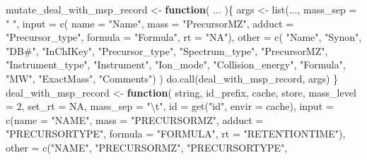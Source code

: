 \documentclass[
]{article}
\newenvironment{Shaded}{\begin{snugshade}}{\end{snugshade}}
\newcommand{\AttributeTok}[1]{\textcolor[rgb]{0.77,0.63,0.00}{#1}}
\newcommand{\ConstantTok}[1]{\textcolor[rgb]{0.00,0.00,0.00}{#1}}
\newcommand{\ControlFlowTok}[1]{\textcolor[rgb]{0.13,0.29,0.53}{\textbf{#1}}}
\newcommand{\DecValTok}[1]{\textcolor[rgb]{0.00,0.00,0.81}{#1}}
\newcommand{\FunctionTok}[1]{\textcolor[rgb]{0.00,0.00,0.00}{#1}}
\newcommand{\NormalTok}[1]{#1}
\newcommand{\OtherTok}[1]{\textcolor[rgb]{0.56,0.35,0.01}{#1}}
\newcommand{\SpecialCharTok}[1]{\textcolor[rgb]{0.00,0.00,0.00}{#1}}
\newcommand{\StringTok}[1]{\textcolor[rgb]{0.31,0.60,0.02}{#1}}
\begin{document}
\begin{Shaded}
\begin{Highlighting}[]
\NormalTok{mutate\_deal\_with\_msp\_record }\OtherTok{\textless{}{-}} 
  \ControlFlowTok{function}\NormalTok{(}
\NormalTok{    ...}
\NormalTok{    )\{}
\NormalTok{    args }\OtherTok{\textless{}{-}} \FunctionTok{list}\NormalTok{(...,}
      \AttributeTok{mass\_sep =} \StringTok{" "}\NormalTok{,}
      \AttributeTok{input =} \FunctionTok{c}\NormalTok{(}
        \AttributeTok{name =} \StringTok{"Name"}\NormalTok{,}
        \AttributeTok{mass =} \StringTok{"PrecursorMZ"}\NormalTok{, }
        \AttributeTok{adduct =} \StringTok{"Precursor\_type"}\NormalTok{,}
        \AttributeTok{formula =} \StringTok{"Formula"}\NormalTok{,}
        \AttributeTok{rt =} \StringTok{"NA"}\NormalTok{),}
      \AttributeTok{other =} \FunctionTok{c}\NormalTok{(}
        \StringTok{"Name"}\NormalTok{, }\StringTok{"Synon"}\NormalTok{, }\StringTok{"DB\#"}\NormalTok{, }\StringTok{"InChIKey"}\NormalTok{,}
        \StringTok{"Precursor\_type"}\NormalTok{, }\StringTok{"Spectrum\_type"}\NormalTok{, }\StringTok{"PrecursorMZ"}\NormalTok{,}
        \StringTok{"Instrument\_type"}\NormalTok{, }\StringTok{"Instrument"}\NormalTok{, }\StringTok{"Ion\_mode"}\NormalTok{,}
        \StringTok{"Collision\_energy"}\NormalTok{, }\StringTok{"Formula"}\NormalTok{,}
        \StringTok{"MW"}\NormalTok{, }\StringTok{"ExactMass"}\NormalTok{, }\StringTok{"Comments"}\NormalTok{)}
\NormalTok{    )}
    \FunctionTok{do.call}\NormalTok{(deal\_with\_msp\_record, args)}
\NormalTok{  \}}
\NormalTok{deal\_with\_msp\_record }\OtherTok{\textless{}{-}}
  \ControlFlowTok{function}\NormalTok{(}
\NormalTok{    string,}
\NormalTok{    id\_prefix,}
\NormalTok{    cache,}
\NormalTok{    store,}
    \AttributeTok{mass\_level =} \DecValTok{2}\NormalTok{,}
    \AttributeTok{set\_rt =} \ConstantTok{NA}\NormalTok{,}
    \AttributeTok{mass\_sep =} \StringTok{"}\SpecialCharTok{\textbackslash{}t}\StringTok{"}\NormalTok{,}
    \AttributeTok{id =} \FunctionTok{get}\NormalTok{(}\StringTok{"id"}\NormalTok{, }\AttributeTok{envir =}\NormalTok{ cache),}
    \AttributeTok{input =} \FunctionTok{c}\NormalTok{(}\AttributeTok{name =} \StringTok{"NAME"}\NormalTok{,}
      \AttributeTok{mass =} \StringTok{"PRECURSORMZ"}\NormalTok{,}
      \AttributeTok{adduct =} \StringTok{"PRECURSORTYPE"}\NormalTok{,}
      \AttributeTok{formula =} \StringTok{"FORMULA"}\NormalTok{,}
      \AttributeTok{rt =} \StringTok{"RETENTIONTIME"}\NormalTok{),}
    \AttributeTok{other =} \FunctionTok{c}\NormalTok{(}\StringTok{"NAME"}\NormalTok{, }\StringTok{"PRECURSORMZ"}\NormalTok{, }\StringTok{"PRECURSORTYPE"}\NormalTok{,}

\end{Highlighting}
\end{Shaded}
\end{document}
